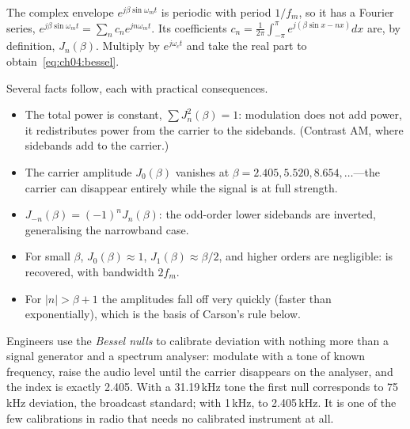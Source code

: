 \begin{deeper}
The complex envelope $e^{j\beta\sin\omega_mt}$ is periodic with period $1/f_m$, so it has a Fourier series,
$e^{j\beta\sin\omega_mt}=\sum_n c_n e^{jn\omega_mt}$. Its coefficients
$c_n=\frac{1}{2\pi}\int_{-\pi}^{\pi}e^{j(\beta\sin x-nx)}dx$ are, by definition, $J_n(\beta)$. Multiply by
$e^{j\omega_ct}$ and take the real part to obtain~\eqref{eq:ch04:bessel}.
\end{deeper}


Several facts follow, each with practical consequences.
\begin{itemize}
\item The total power is constant, $\sum J_n^2(\beta)=1$: modulation does not add power, it redistributes
power from the carrier to the sidebands. (Contrast AM, where sidebands add to the carrier.)
\item The carrier amplitude $J_0(\beta)$ vanishes at $\beta=2.405, 5.520, 8.654,\dots$---the carrier can
disappear entirely while the signal is at full strength.
\item $J_{-n}(\beta)=(-1)^nJ_n(\beta)$: the odd-order lower sidebands are inverted, generalising the
narrowband case.
\item For small $\beta$, $J_0(\beta)\approx1$, $J_1(\beta)\approx\beta/2$, and higher orders are
negligible:  is recovered, with bandwidth $2f_m$.
\item For $|n|>\beta+1$ the amplitudes fall off very quickly (faster than exponentially), which is the
basis of Carson's rule below.
\end{itemize}

\begin{inpractice}
Engineers use the \emph{Bessel nulls} to calibrate deviation with nothing more than a signal generator and
a spectrum analyser: modulate with a tone of known frequency, raise the audio level until the carrier
disappears on the analyser, and the index is exactly 2.405. With a 31.19\,kHz tone the first null
corresponds to 75\,kHz deviation, the broadcast standard; with 1\,kHz, to 2.405\,kHz. It is one of the
few calibrations in radio that needs no calibrated instrument at all.
\end{inpractice}

